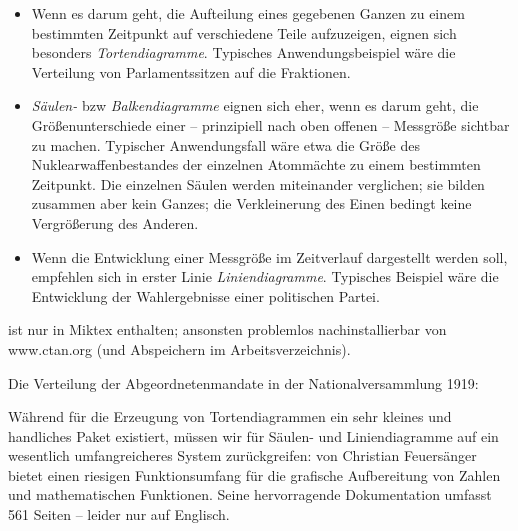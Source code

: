 \begin{itemize}
    \item Wenn es darum geht, die Aufteilung eines gegebenen Ganzen zu einem bestimmten Zeitpunkt
        auf verschiedene Teile aufzuzeigen, eignen sich besonders \emph{Tortendiagramme}.
        Typisches Anwendungsbeispiel wäre die Verteilung von Parlamentssitzen auf die Fraktionen.
    \item \emph{Säulen-} bzw \emph{Balkendiagramme} eignen sich eher, wenn es darum geht, die
        Größenunterschiede einer -- prinzipiell nach oben offenen -- Messgröße sichtbar zu machen.
        Typischer Anwendungsfall wäre etwa die Größe des Nuklearwaffenbestandes der einzelnen
        Atommächte zu einem bestimmten Zeitpunkt. Die einzelnen Säulen werden miteinander verglichen;
        sie bilden zusammen aber kein Ganzes; die Verkleinerung des Einen bedingt keine Vergrößerung
        des Anderen. 
    \item Wenn die Entwicklung einer Messgröße im Zeitverlauf dargestellt werden soll, empfehlen
        sich in erster Linie \emph{Liniendiagramme}.
        Typisches Beispiel wäre die Entwicklung der Wahlergebnisse einer politischen Partei. 
\end{itemize}


 ist nur in Miktex enthalten; ansonsten problemlos nachinstallierbar von 
www.ctan.org (und Abspeichern im Arbeitsverzeichnis).

Die Verteilung der Abgeordnetenmandate in der Nationalversammlung 1919:

\begin{lfgwexample}{}
\end{lfgwexample}


 

Während für die Erzeugung von Tortendiagrammen ein sehr kleines und handliches Paket existiert,
müssen wir für Säulen- und Liniendiagramme auf ein wesentlich umfangreicheres System zurückgreifen:
 von Christian Feuersänger bietet einen riesigen Funktionsumfang für die 
grafische Aufbereitung von Zahlen und mathematischen Funktionen. Seine hervorragende Dokumentation
umfasst  561 Seiten -- leider nur auf Englisch.

